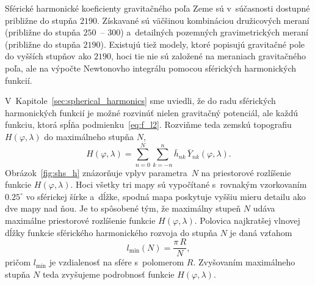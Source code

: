 \documentclass[a4paper, 12pt]{book}
\begin{document}
Sférické harmonické koeficienty gravitačného poľa Zeme sú v~súčasnosti dostupné 
približne do stupňa $2190$.  Získavané sú väčšinou kombináciou družicových 
meraní (približne do stupňa $250$~-- $300$) a~detailných pozemných 
gravimetrických meraní (približne do stupňa $2190$).  Existujú tiež modely, 
ktoré popisujú gravitačné pole do vyšších stupňov ako $2190$, hoci tie nie sú 
založené na meraniach gravitačného poľa, ale na výpočte Newtonovho integrálu 
pomocou sférických harmonických funkcií.

V~Kapitole~\ref{sec:spherical_harmonics} sme uviedli, že do radu sférických 
harmonických funkcií je možné rozvinúť nielen gravitačný potenciál, ale každú 
funkciu, ktorá spĺňa podmienku~\ref{eq:f_l2}.  Rozviňme teda zemskú topografiu 
$H(\varphi, \lambda)$ do maximálneho stupňa $N$,
%
\begin{equation}
\label{eq:h_shs}
H(\varphi, \lambda) = \sum_{n = 0}^{N} \sum_{k = -n}^n \bar{h}_{nk} \, 
\bar{Y}_{nk}(\varphi, \lambda){.}
\end{equation}
%
Obrázok~\ref{fig:shs_h} znázorňuje vplyv parametra~$N$ na priestorové 
rozlíšenie funkcie $H(\varphi, \lambda)$.  Hoci všetky tri mapy sú vypočítané 
s~rovnakým vzorkovaním $0.25^{\circ}$ vo sférickej šírke a~dĺžke, spodná mapa 
poskytuje vyššiu mieru detailu ako dve mapy nad ňou.  Je to spôsobené tým, že 
maximálny stupeň $N$ udáva maximálne priestorové rozlíšenie funkcie 
$H(\varphi,\lambda)$.  Polovica najkratšej vlnovej dĺžky funkcie sférického 
harmonického rozvoja do stupňa $N$ je daná vzťahom
%
\begin{equation}
l_{\min}(N) = \frac{\pi \, R}{N}{,}
\end{equation}
%
pričom $l_{\min}$ je vzdialenosť na sfére s~polomerom $R$.  Zvyšovaním 
maximálneho stupňa $N$ teda zvyšujeme podrobnosť funkcie $H(\varphi, \lambda)$.
\end{document}
